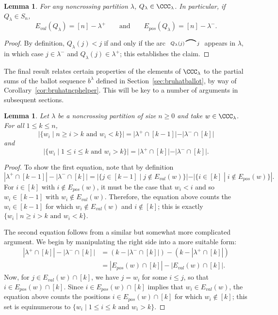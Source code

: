 \documentclass[12pt]{amsart}
\newtheorem{lem}[equation]{Lemma}
\theoremstyle{definition}
\theoremstyle{remark}
\numberwithin{equation}{section}
\renewcommand{\setminus}{-}
\newcommand{\EP}{E_{pos}}
\newcommand{\EV}{E_{val}}
\newcommand{\edge}[2]{\tikz[scale = 0.75, baseline = -0.2cm]{
\draw (0.1, 0) node[inner sep = 0ex] (a) {};
\node[left, xshift = 0.1cm, yshift = -0.1cm] at (a) {$\scriptstyle #1$};
\draw (0.9, 0)  node[inner sep = 0ex] (b) {};
\node[right, xshift = -0.1cm, yshift = -0.1cm] at (b) {$\scriptstyle #2$};
\draw[thick] (a) to[out = 35, in = 145] (b);}}
\begin{document}
\begin{lem}
\label{lem:QSVexcedance}
For any noncrossing partition $\lambda$, $Q_{\lambda} \in \CCC_{\lambda}$.  In particular, if $Q_{\lambda} \in S_{n}$, 
\[
\EV(Q_{\lambda}) = [n] \setminus \lambda^{+}
\qquad\text{and}\qquad
\EP(Q_{\lambda}) = [n] \setminus \lambda^{-}.
\]
\end{lem}
\begin{proof}
By definition, $Q_{\lambda}(j) < j$ if and only if the arc $ \edge{Q_{\lambda}(j)}{j}$ appears in $\lambda$, in which case $j \in \lambda^{-}$ and $Q_{\lambda}(j) \in \lambda^{+}$; this establishes the claim.
\end{proof}

The final result relates certain properties of the elements of $\CCC_{\lambda}$ to the partial sums of the ballot sequence $b^{\lambda}$ defined in Section~\ref{sec:bruhatballot}, by way of Corollary~\ref{cor:bruhatncphelper}.  This will be key to a number of arguments in subsequent sections.


\begin{lem}
\label{lem:tableautobruhat}
Let $\lambda$ be a noncrossing partition of size $n \ge 0$ and take $w \in \CCC_{\lambda}$.  For all $1 \le k \le n$, 
\[
|\{ w_{i} \;|\; \text{$n \ge i > k$ and $w_{i} < k$}\}|
= |\lambda^{+} \cap [k-1]| - |\lambda^{-} \cap [k]|
\]
and 
\[
|\{ w_{i} \;|\; \text{$1 \le i \le k$ and $w_{i} > k$}\}|
= |\lambda^{+} \cap [k]| - |\lambda^{-} \cap [k] |.
\]
\end{lem}
\begin{proof}
To show the first equation, note that by definition
\[
|\lambda^{+} \cap [k-1]| - |\lambda^{-} \cap [k]| = |\{j \in [k-1] \;|\; j \notin \EV(w)\}| - |\{i \in [k] \;|\; i \notin \EP(w)\}|.
\]
For $i \in [k]$ with $i \notin \EP(w)$, it must be the case that $w_{i} < i$ and so $w_{i} \in [k-1]$ with $w_{i} \notin \EV(w)$.  
Therefore, the equation above counts the $w_{i} \in [k-1]$ for which $w_{i} \notin \EV(w)$ and $i \notin [k]$; this is exactly $\{ w_{i} \;|\; \text{$n \ge i > k$ and $w_{i} < k$}\}$.

The second equation follows from a similar but somewhat more complicated argument.  We begin by manipulating the right side into a more suitable form:
\begin{align*}
|\lambda^{+} \cap [k]| - |\lambda^{-} \cap [k] | &=  (k - |\lambda^{-} \cap [k] |) - (k - |\lambda^{+} \cap [k]|) \\
&= |\EP(w) \cap [k]| - |\EV(w) \cap [k]|.
\end{align*}
Now, for $j \in \EV(w) \cap [k]$, we have $j = w_{i}$ for some $i \le j$, so that $i \in \EP(w) \cap [k]$.  Since $i \in \EP(w) \cap [k]$ implies that $w_{i} \in \EV(w)$, the equation above counts the positions $i \in \EP(w) \cap [k]$ for which $w_{i} \notin [k]$; this set is equinumerous to $\{ w_{i} \;|\; \text{$1 \le i \le k$ and $w_{i} > k$}\}$.
\end{proof}
\end{document}
